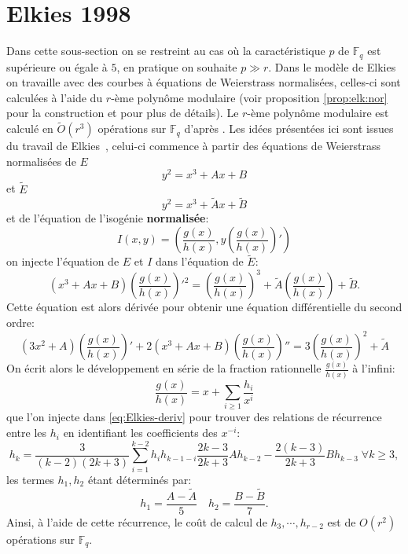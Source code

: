 \documentclass[10pt,a4paper]{book}
\theoremstyle{plain}
\theoremstyle{definition}
\theoremstyle{definition}
\theoremstyle{definition}
\theoremstyle{definition}
\theoremstyle{definition}
\theoremstyle{remark}
\theoremstyle{remark}
\theoremstyle{definition}
\begin{document}
\section{Elkies 1998}
Dans cette sous-section on se restreint au cas où la caractéristique $p$ de 
$\mathbb{F}_q$ est supérieure ou égale à $5$, en pratique on souhaite $p \gg r$.
Dans le modèle de Elkies on travaille avec des courbes à équations de 
Weierstrass normalisées, celles-ci sont calculées à l'aide du $r$-ème polynôme 
modulaire (voir proposition \ref{prop:elk:nor} pour la construction et 
\cite{Schoof95} pour plus de détails). Le $r$-ème polynôme modulaire est 
calculé en $\tilde{O}(r^3)$ opérations sur $\mathbb{F}_q$ d'après \cite{Enge09} \cite[Algorithm 6.1, Theorem 1]{BLS12}.
Les idées présentées ici sont issues du travail de Elkies~\cite[§The kernel of
 the isogeny]{Elkies1998}, celui-ci commence à partir des équations de 
 Weierstrass normalisées de $E$
\begin{equation}
y^2=x^3+Ax+B
\end{equation}
 et $\tilde{E}$
\begin{equation}
y^2=x^3+\tilde{A}x+\tilde{B}
\end{equation}
et de l'équation de l'isogénie \textbf{normalisée}:
\begin{equation} 
I(x,y)=\left(\frac{g(x)}{h(x)},y\left( \frac{g(x)}{h(x)} \right)'\right) 
\end{equation}
on injecte l'équation de $E$ et $I$ dans l'équation de $\tilde{E}$:
\begin{equation}
(x^3+Ax+B)\left(\frac{g(x)}{h(x)} \right)'^2=  \left(\frac{g(x)}{h(x)} \right)^3 + \tilde{A} \left(\frac{g(x)}{h(x)} \right) + \tilde{B}.
\end{equation}
Cette équation est alors dérivée pour obtenir une équation différentielle du second ordre:
\begin{equation}
\label{eq:Elkies-deriv}
(3x^2+A)\left(\frac{g(x)}{h(x)} \right)'+2(x^3+Ax+B)\left(\frac{g(x)}{h(x)} \right)''=  3\left(\frac{g(x)}{h(x)} \right)^2 + \tilde{A}
\end{equation}
On écrit alors le développement en série de la fraction rationnelle $\frac{g(x)}{h(x)}$ à l'infini:
\begin{equation}
\label{eq:iso:frac}
\frac{g(x)}{h(x)}=x+ \sum_{i\geqslant 1} \frac{h_i}{x^i}
\end{equation}
que l'on injecte dans \eqref{eq:Elkies-deriv} pour trouver des relations de récurrence entre les $h_i$ en identifiant les coefficients des $x^{-i}$:
\begin{equation}
\label{eq:rec:h_k}
h_k=\frac{3}{(k-2)(2k+3)}\sum_{i=1}^{k-2}h_ih_{k-1-i}\frac{2k-3}{2k+3}Ah_{k-2}-\frac{2(k-3)}{2k+3}Bh_{k-3} \; \forall k \geqslant 3,
\end{equation}
les termes $h_1,h_2$ étant déterminés par:
\begin{equation}
h_1=\frac{A-\tilde{A}}{5} \quad h_2={\frac{B-\tilde{B}}{7}}.
\end{equation}
Ainsi, à l'aide de cette récurrence, le coût de calcul de $h_3, \cdots , h_{r-2}$ est de $O(r^2)$ opérations sur $\mathbb{F}_q$. 
\end{document}
